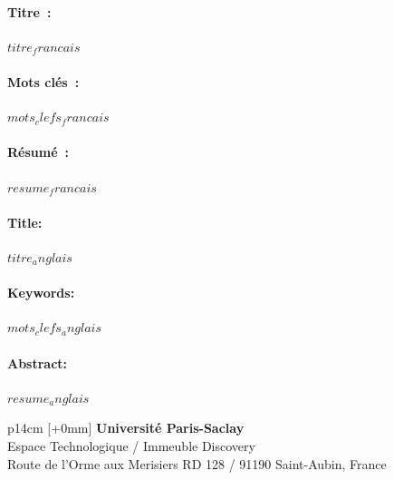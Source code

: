 \documentclass[12pt,a4paper]{reedthesis}
\begin{document}
\begin{mdframed}[linecolor=Prune,linewidth=1]
\vspace{-.25cm}
\paragraph*{Titre~:} $titre_francais$
\begin{small}
\vspace{-.25cm}
\paragraph*{Mots clés~:} $mots_clefs_francais$

\vspace{-.5cm}
\begin{multicols}{2}
\paragraph*{Résumé~:} $resume_francais$
\end{multicols}
\end{small}
\end{mdframed}

\begin{mdframed}[linecolor=Prune,linewidth=1]
\vspace{-.25cm}
\paragraph*{Title:} $titre_anglais$

\begin{small}
\vspace{-.25cm}
\paragraph*{Keywords:} $mots_clefs_anglais$

\vspace{-.5cm}
\begin{multicols}{2}
\paragraph*{Abstract:} $resume_anglais$
\end{multicols}
\end{small}
\end{mdframed}


\vfill
{}\selectfont
\noindent\begin{tabular}{p{14cm}}
[+0mm]{\small {\color{Prune} {\bf Université Paris-Saclay}\\
{\scriptsize Espace Technologique / Immeuble Discovery}\\
{\scriptsize  Route de l’Orme aux Merisiers RD 128 / 91190 Saint-Aubin, France}}}\\\mbox{}
\end{tabular}


\end{document}
